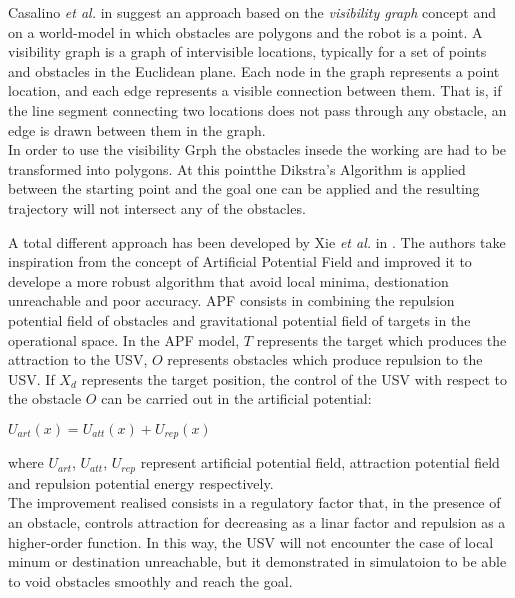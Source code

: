 \documentclass[journal]{IEEEtran}
\begin{document}
              \indent Casalino \textit{et al.} in \cite{Casalino2009} suggest an approach based on the \textit{visibility graph} concept and on a world-model in which obstacles are polygons and the robot is a point. A visibility graph is a graph of intervisible locations, typically for a set of points and obstacles in the Euclidean plane. Each node in the graph represents a point location, and each edge represents a visible connection between them. That is, if the line segment connecting two locations does not pass through any obstacle, an edge is drawn between them in the graph.\\
              In order to use the visibility Grph the obstacles insede the working are had to be transformed into polygons. At this pointthe Dikstra's Algorithm is applied between the starting point and the goal one can be applied and the resulting trajectory will not intersect any of the obstacles.

              A total different approach has been developed by Xie \textit{et al.} in \cite{Xie2014}. The authors take inspiration from the concept of Artificial Potential Field \cite{Khatib1985} and improved it to develope a more robust algorithm that avoid local minima, destionation unreachable and poor accuracy. APF consists in combining the repulsion potential field of obstacles and gravitational potential field of targets in the operational space. In the APF model, $T$ represents the target which produces the attraction to the USV, $O$ represents obstacles which produce repulsion to the USV. If $X_d$ represents the target position, the control of the USV with respect to the obstacle $O$ can be carried out in the artificial potential:
                  \begin{center}
                         $U_{art}(x) = U_{att}(x) + U_{rep}(x)$
                  \end{center}
              where $U_{art}$, $U_{att}$, $U_{rep}$ represent artificial potential field, attraction potential field and repulsion potential energy respectively.\\
              The improvement realised consists in a regulatory factor that, in the presence of an obstacle, controls attraction for decreasing as a linar factor and repulsion as a higher-order function. In this way, the USV will not encounter the case of local minum or destination unreachable, but it demonstrated in simulatoion to be able to void obstacles smoothly and reach the goal.\\
\end{document}
